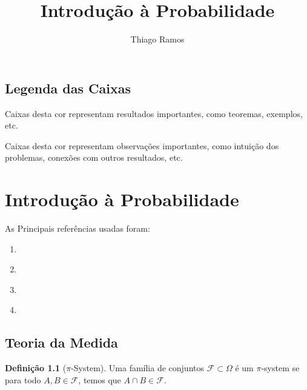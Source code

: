 \documentclass[12pt,a4paper,oneside]{book}
\theoremstyle{definition}
\newtheorem{definition}[theorem]{Defini\c{c}\~ao}
\theoremstyle{remark}
\numberwithin{equation}{section}
\begin{document}
\title{{\Huge Introdução à Probabilidade}}

\author{Thiago Ramos}

\maketitle


\tableofcontents
\newpage 


\section*{Legenda das Caixas}


\begin{tcolorbox}
Caixas desta cor representam resultados importantes, como teoremas, exemplos, etc.
\end{tcolorbox}

\begin{tcolorbox}[colback = yellow!70]
Caixas desta cor representam observações importantes, como intuição dos problemas, conexões com outros resultados, etc.
\end{tcolorbox}



\chapter{Introdução à Probabilidade  }

\begin{tcolorbox}[colback = white]
As Principais referências usadas foram:
\begin{enumerate}
\item \cite{durrett}
\item \cite{spencer-probMethod}
\item \cite{knill}
\item \cite{stoyanov2014counterexamples}
\end{enumerate}

\end{tcolorbox}

\section{Teoria da Medida}


\begin{definition}[$\pi$-System]  Uma família de conjuntos $\mathcal{F}\subset \Omega$ é um $\pi$-system se para todo $A,B\in \mathcal{F}$, temos que $A\cap B\in \mathcal{F}.$

\end{definition}
\end{document}
